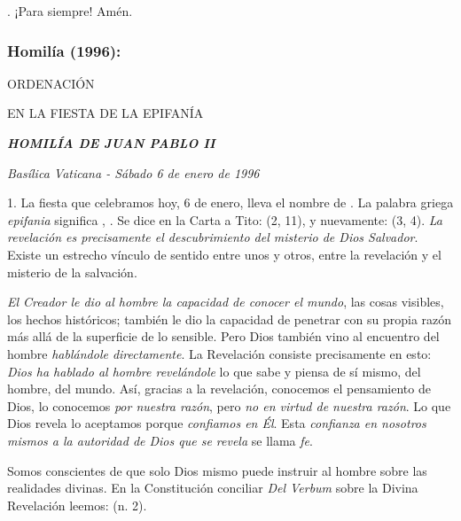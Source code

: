 \begin{body}
	. ¡Para siempre! Amén.

	\subsubsection{Homilía (1996):} ORDENACIÓN

	EN LA FIESTA DE LA EPIFANÍA

	\emph{\textbf{HOMILÍA DE JUAN PABLO II}}

	\emph{Basílica Vaticana - Sábado 6 de enero de 1996}

	1. La fiesta que celebramos hoy, 6 de enero, lleva el nombre de . La palabra griega \emph{epifania} significa , . Se dice en la Carta a Tito:  (2, 11), y nuevamente:  (3, 4). \emph{La revelación es precisamente el descubrimiento del misterio de Dios Salvador}. Existe un estrecho vínculo de sentido entre unos y otros, entre la revelación y el misterio de la salvación.

	\emph{El Creador le dio al hombre la capacidad de conocer el mundo}, las cosas visibles, los hechos históricos; también le dio la capacidad de penetrar con su propia razón más allá de la superficie de lo sensible. Pero Dios también vino al encuentro del hombre \emph{hablándole directamente}. La Revelación consiste precisamente en esto: \emph{Dios ha hablado al hombre revelándole} lo que sabe y piensa de sí mismo, del hombre, del mundo. Así, gracias a la revelación, conocemos el pensamiento de Dios, lo conocemos \emph{por nuestra razón}, pero \emph{no en virtud de nuestra razón}. Lo que Dios revela lo aceptamos porque \emph{confiamos en Él}. Esta \emph{confianza en nosotros mismos a la autoridad de Dios que se revela} se llama \emph{fe}.

	Somos conscientes de que solo Dios mismo puede instruir al hombre sobre las realidades divinas. En la Constitución conciliar \emph{Del Verbum} sobre la Divina Revelación leemos:  (n. 2).


\end{body}
